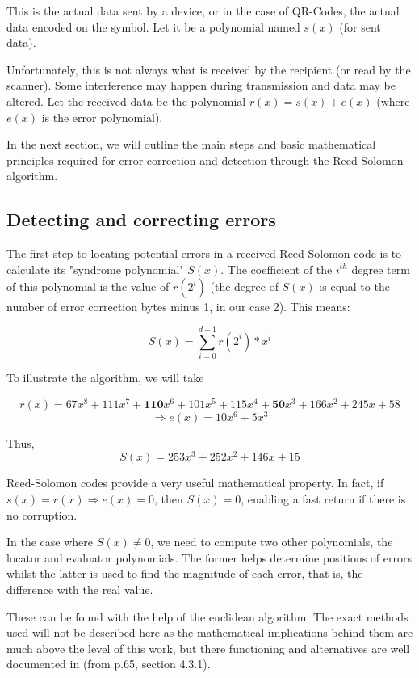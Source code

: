 This is the actual data sent by a device, or in the case of QR-Codes, the actual data encoded on the symbol. Let it be a polynomial named $s(x)$ (for sent data).

Unfortunately, this is not always what is received by the recipient (or read by the scanner). Some interference may happen during transmission and data may be altered. Let the received data be the polynomial $r(x) = s(x) + e(x)$ (where $e(x)$ is the error polynomial).

In the next section, we will outline the main steps and basic mathematical principles required for error correction and detection through the Reed-Solomon algorithm.

\subsection{Detecting and correcting errors}
\label{ssec:rs_error_correction}

The first step to locating potential errors in a received Reed-Solomon code is to calculate its "syndrome polynomial" $S(x)$. The coefficient of the $i^{th}$ degree term of this polynomial is the value of $r(2^i)$ (the degree of $S(x)$ is equal to the number of error correction bytes minus 1, in our case 2). This means:

\[
  S(x) = \sum_{i=0}^{d-1} r(2^i) * x^i
\]

To illustrate the algorithm, we will take

\[ r(x) = 67x^8 + 111x^7 + \textbf{110}x^6 + 101x^5 + 115x^4 + \textbf{50}x^3 + 166x^2 + 245x + 58 \]
\[ \Rightarrow e(x) = 10x^6 + 5x^3 \]

Thus, \[
  S(x) = 253x^3 + 252x^2 + 146x + 15
\]

Reed-Solomon codes provide a very useful mathematical property. In fact, if $s(x) = r(x) \Rightarrow e(x) = 0$, then $S(x) = 0$, enabling a fast return if there is no corruption.

In the case where $S(x) \not= 0$, we need to compute two other polynomials, the locator and evaluator polynomials. The former helps determine positions of errors whilst the latter is used to find the magnitude of each error, that is, the difference with the real value.

These can be found with the help of the euclidean algorithm. The exact methods used will not be described here as the mathematical implications behind them are much above the level of this work, but there functioning and alternatives are well documented in \cite{nasa_rs} (from p.65, section 4.3.1).

